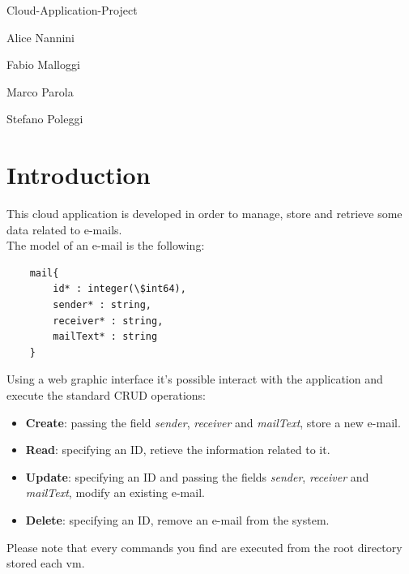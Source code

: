 \documentclass{article}
\begin{document}
\begin{titlepage}
\begin{center}
{\Huge Cloud-Application-Project \par}
\vspace{18mm}
{\huge Alice Nannini \par}
{\huge Fabio Malloggi \par}
{\huge Marco Parola \par}
{\huge Stefano Poleggi \par}
\end{center}
\end{titlepage}




\section{Introduction}
This cloud application is developed in order to manage, store and retrieve some data related to e-mails.\\
The model of an e-mail is the following:
\begin{verbatim}
    mail{
        id* : integer(\$int64),
        sender* : string,
        receiver* : string,
        mailText* : string
    }
\end{verbatim}
Using a web graphic interface it's possible interact with the application and execute the standard CRUD operations:
\begin{itemize}
\item \textbf{Create}: passing the field \textit{sender}, \textit{receiver} and \textit{mailText}, store a new e-mail.
\item \textbf{Read}: specifying an ID, retieve the information related to it.
\item \textbf{Update}: specifying an ID and passing the fields \textit{sender}, \textit{receiver} and \textit{mailText}, modify an existing e-mail.
\item \textbf{Delete}: specifying an ID, remove an e-mail from the system.
\end{itemize}
Please note that every commands you find are executed from the root directory stored each vm.
\end{document}
